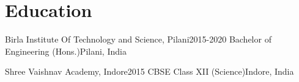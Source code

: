 \section{Education}
  \resumeSubHeadingListStart
    \resumeSubheading
      {Birla Institute Of Technology and Science, Pilani}{2015-2020}
      {Bachelor of Engineering (Hons.)}{Pilani, India}
  \resumeSubHeadingListEnd

  \vspace{-8pt}
  
  \resumeSubHeadingListStart
    \resumeSubheading
      {Shree Vaishnav Academy, Indore}{2015}
      {CBSE Class XII (Science)}{Indore, India}
  \resumeSubHeadingListEnd
